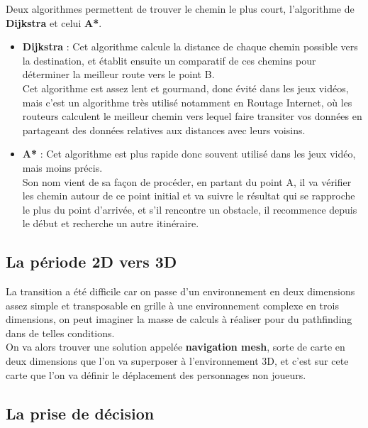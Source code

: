 \documentclass[a4paper,10pt,final,fleqn]{article}
\begin{document}
		Deux algorithmes permettent de trouver le chemin le plus court, l'algorithme de \textbf{Dijkstra} et celui \textbf{A*}.\\

		\begin{itemize}
			\item \textbf{Dijkstra} : Cet algorithme calcule la distance de chaque chemin possible vers la destination, et établit ensuite un comparatif de ces chemins pour déterminer la meilleur route vers le point B.\\
			Cet algorithme est assez lent et gourmand, donc évité dans les jeux vidéos, mais c'est un algorithme très utilisé notamment en Routage Internet, où les routeurs calculent le meilleur chemin vers lequel faire transiter vos données en partageant des données relatives aux distances avec leurs voisins.\\

			\item \textbf{A*} : Cet algorithme est plus rapide donc souvent utilisé dans les jeux vidéo, mais moins précis.\\
			Son nom vient de sa façon de procéder, en partant du point A, il va vérifier les chemin autour de ce point initial et va suivre le résultat qui se rapproche le plus du point d'arrivée, et s'il rencontre un obstacle, il recommence depuis le début et recherche un autre itinéraire.
		\end{itemize}

	\subsection{La période 2D vers 3D}

		La transition a été difficile car on passe d'un environnement en deux dimensions assez simple et transposable en grille à une environnement complexe en trois dimensions, on peut imaginer la masse de calculs à réaliser pour du pathfinding dans de telles conditions.\\

		On va alors trouver une solution appelée \textbf{navigation mesh}, sorte de carte en deux dimensions que l'on va superposer à l'environnement 3D, et c'est sur cete carte que l'on va définir le déplacement des personnages non joueurs.\\

	\subsection{La prise de décision}
\end{document}

